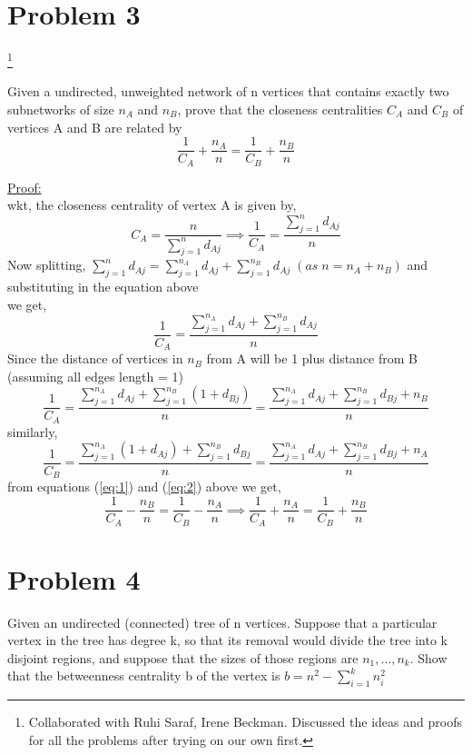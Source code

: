 \documentclass{article}
\newcommand\blfootnote[1]{%
  \begingroup
  \renewcommand\thefootnote{}\footnote{#1}%
  \addtocounter{footnote}{-1}%
  \endgroup
}
\begin{document}
\section*{Problem 3}
\blfootnote{Collaborated with Ruhi Saraf, Irene Beckman. Discussed the ideas and proofs for all the problems after trying on our own first.}
Given a undirected, unweighted network of n vertices that contains exactly two subnetworks of size $n_A$ and $n_B$, prove that the closeness centralities $C_A$ and $C_B$ of vertices A and B are related by 
$$\dfrac{1}{C_A} + \dfrac{n_A}{n} = \dfrac{1}{C_B} + \dfrac{n_B}{n}$$

\underline{Proof:}\\

wkt, the closeness centrality of vertex A is given by,
$$C_A = \dfrac{n}{\sum_{j=1}^{n} d_{Aj}} \implies
\dfrac{1}{C_A} = \dfrac{\sum_{j=1}^{n} d_{Aj}}{n}$$
\hspace{0.5 cm}
Now splitting,  $\sum_{j=1}^{n} d_{Aj} = \sum_{j=1}^{n_A} d_{Aj} + \sum_{j=1}^{n_B} d_{Aj} \;(as\; n = n_A + n_B)$ and substituting in the equation above\\

we get, $$\dfrac{1}{C_A} = \dfrac{\sum_{j=1}^{n_A} d_{Aj} + \sum_{j=1}^{n_B} d_{Aj}}{n}$$
\hspace{0.5 cm}
Since the distance of vertices in $n_B$ from A will be 1 plus distance from B (assuming all edges length = 1)
\begin{equation} \label{eq:1}
\dfrac{1}{C_A} = \dfrac{\sum_{j=1}^{n_A} d_{Aj} + \sum_{j=1}^{n_B} (1+d_{Bj})}{n}
= \dfrac{\sum_{j=1}^{n_A} d_{Aj} + \sum_{j=1}^{n_B} d_{Bj} + n_B}{n}
\end{equation}
\hspace{0.5 cm}
similarly,
\begin{equation} \label{eq:2}
\dfrac{1}{C_B} = \dfrac{\sum_{j=1}^{n_A} (1+d_{Aj}) + \sum_{j=1}^{n_B} d_{Bj}}{n} = \dfrac{\sum_{j=1}^{n_A} d_{Aj} + \sum_{j=1}^{n_B} d_{Bj} + n_A}{n}
\end{equation}
\hspace{0.5 cm}
from equations (\ref{eq:1}) and (\ref{eq:2}) above we get,
$$\dfrac{1}{C_A} - \dfrac{n_B}{n} = \dfrac{1}{C_B} - \dfrac{n_A}{n} \implies \dfrac{1}{C_A} + \dfrac{n_A}{n} = \dfrac{1}{C_B} + \dfrac{n_B}{n}$$

\section*{Problem 4}

Given an undirected (connected) tree of n vertices. Suppose that a particular
vertex in the tree has degree k, so that its removal would divide the tree into k disjoint regions, and suppose that the sizes of those regions are $n_1, . . . ,n_k$. Show that the betweenness centrality b of the vertex is $b = n^2 - \sum_{i=1}^{k} n^2_i$\\
\end{document}
